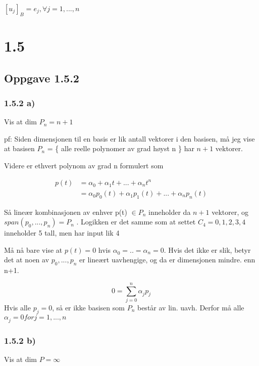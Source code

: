 \documentclass[11pt]{article}
\begin{document}
$[u_j]_B = e_j, \forall j = 1,...,n$





\section{1.5}

\subsection{Oppgave 1.5.2}


\subsubsection{1.5.2 a)}
 
Vis at dim \( P_n = n + 1 \)

pf: Siden dimensjonen til en basis er lik antall vektorer i den basisen, må jeg vise at basisen $ P_n $  = \{ alle reelle polynomer av grad høyst n \} har \( n+1 \) vektorer.

Videre er ethvert polynom av grad n formulert som

\begin{align*}
    p(t) &= \alpha_{0}^{} + \alpha_{1}^{} t + ... + \alpha_{n}^{} t^n \\
    &= \alpha_{0}^{} p_0(t) + \alpha_{1}^{} p_1(t) + ... + \alpha_{n}^{} p_n(t) 
\end{align*}


Så lineær kombinasjonen av enhver p(t) $\in P_n$ inneholder da $ n+1 $ vektorer, og $ span(p_0, ..., p_n) = P_n $ . Logikken er det samme som at settet $C_4 = {0, 1, 2, 3, 4} $ inneholder  5 tall, men har input lik 4

Må nå bare vise at $ p(t) = 0 $ hvis $ \alpha_{0}^{} = .. = \alpha_{n}^{} = 0 $. Hvis det ikke er slik, betyr det at noen av $ p_0, ..., p_n $ er lineært uavhengige, og da er dimensjonen mindre. enn n+1.

\[
     0 = \sum_{ j=0 }^{ n } \alpha_{j}^{} p_j
\] 
Hvis alle $ p_j = 0 $, så er ikke basisen som $ P_n $ består av lin. uavh. Derfor må alle $ \alpha_{j}^{} = 0 for j=1,..., n  $



\subsubsection{1.5.2 b)}


Vis at dim $ P = \infty $ 
\end{document}
